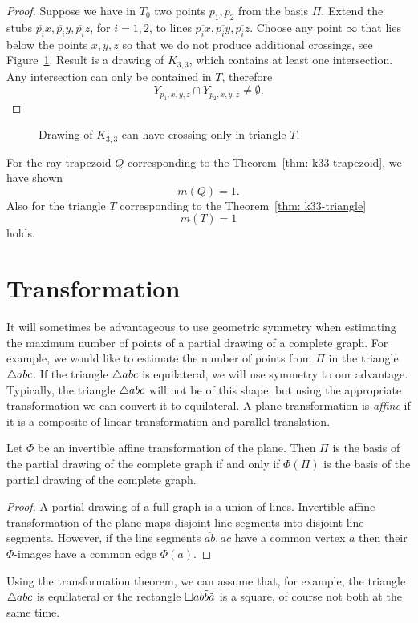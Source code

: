 \begin{proof}
Suppose we have in $T_{0}$ two points $p_{1}, p_{2}$ from the basis $\Pi$.
Extend the stubs $\overline{p_{i}}x, \overline{p_{i}}y, \overline{p_{i}}z$, for $i = 1,2$, to lines $\overline{p_{i}x}, \overline{p_{i}y}, \overline{p_{i}z}$. Choose any point $\infty$ that lies below the points $x,y,z$ so that we do not produce additional crossings, see Figure~\ref{fig: k33-triangle}. Result is a drawing of $K_{3, 3}$, which contains at least one intersection. Any intersection can only be contained in $T$, therefore
$$
Y_{p_{1},x,y,z} \cap Y_{p_{2},x,y,z} \neq \emptyset.
$$
\end{proof}

\begin{figure}
\centering

\caption{Drawing of $K_{3,3}$ can have crossing only in triangle $T$.}
\label{fig: k33-triangle}
\end{figure}

For the ray trapezoid $Q$ corresponding to the Theorem~\ref{thm: k33-trapezoid}, we have shown
$$
m(Q) = 1.
$$
Also for the triangle $T$ corresponding to the Theorem~\ref{thm: k33-triangle}
$$
m(T) = 1
$$
holds.

\section{Transformation}
It will sometimes be advantageous to use geometric symmetry when estimating the maximum number of points of a partial drawing of a complete graph. For example, we would like to estimate the number of points from $\Pi$ in the triangle $\triangle{abc}$. If the triangle $\triangle{abc}$ is equilateral, we will use symmetry to our advantage. Typically, the triangle $\triangle{abc}$ will not be of this shape, but using the appropriate transformation we can convert it to equilateral. A plane transformation is \textit{affine} if it is a composite of linear transformation and parallel translation.

\begin{theorem}[Transformation]
\label{thm: transformation}
Let $\Phi$ be an invertible affine transformation of the plane. Then $\Pi$ is the basis of the partial drawing of the complete graph if and only if $\Phi(\Pi)$ is the basis of the partial drawing of the complete graph.
\end{theorem}

\begin{proof}
A partial drawing of a full graph is a union of lines. Invertible affine transformation of the plane maps disjoint line segments into disjoint line segments. However, if the line segments $\overline{ab}, \overline{ac}$ have a common vertex $a$ then their $\Phi$-images have a common edge $\Phi(a)$.
\end{proof}

Using the transformation theorem, we can assume that, for example, the triangle $\triangle{abc}$ is equilateral or the rectangle $\Box{ab}\tilde{b}\tilde{a}$ is a square, of course not both at the same time.
